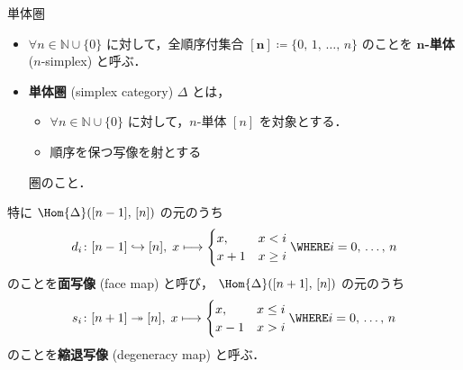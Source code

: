 \documentclass[TQFT_main]{subfiles}
\begin{document}
\begin{mydef}[label=def:simplex-cat,breakable]{単体圏}
    \begin{itemize}
        \item $\forall n \in \mathbb{N} \cup \{0\}$ に対して，全順序付集合 $\bm{[n]} \coloneqq \{0,\, 1,\, \dots,\, n\}$ のことを $\bm{n}$\textbf{-単体} ($n$-simplex) と呼ぶ．
        \item \textbf{単体圏} (simplex category) $\Delta$ とは，
        \begin{itemize}
            \item $\forall n \in \mathbb{N} \cup \{0\}$ に対して，$n$-単体 $[n]$ を対象とする．
            \item 順序を保つ写像を射とする
        \end{itemize}
        圏のこと．
    \end{itemize}
    
    \tcblower

    特に $\Hom{\Delta} ([n-1],\, [n])$ の元のうち
    \begin{align}
        d_i \colon [n-1] \hookrightarrow [n],\; x \lmto 
        \begin{cases}
            x, &x < i \\
            x+1 &x \ge i
        \end{cases}
        \WHERE i = 0,\, \dots,\, n
    \end{align}
    のことを\textbf{面写像} (face map) と呼び，
    $\Hom{\Delta}([n+1],\, [n])$ の元のうち
    \begin{align}
        s_i \colon [n+1] \twoheadrightarrow [n],\; x \lmto 
        \begin{cases}
            x, &x \le i \\
            x-1 &x > i
        \end{cases}
        \WHERE i=0,\, \dots,\, n
    \end{align}
    のことを\textbf{縮退写像} (degeneracy map) と呼ぶ．
\end{mydef}
\end{document}
